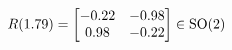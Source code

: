\documentclass[preview]{standalone}
\begin{document}
\begin{align*}
\special{dvisvgm:raw <g id='unique000'>}R(1.79) = \begin{bmatrix} -0.22 & -0.98 \\ 0.98 & -0.22 \end{bmatrix} \in \text{SO}(2)\special{dvisvgm:raw </g>}
\end{align*}
\end{document}
